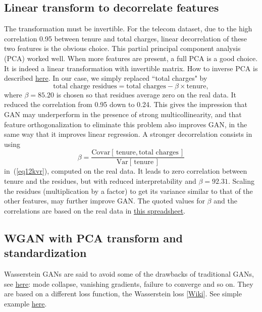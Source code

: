 \documentclass[oneside,10pt]{book}
\begin{document}
\subsection{Linear transform to decorrelate features}\label{lin12qdj}

The transformation must be invertible.  For the telecom dataset, due to the high correlation 0.95 between tenure and total charges, linear decorrelation of these two features is the obvious choice. This partial \textcolor{index}{principal component analysis} (PCA) worked well. When more features are present, a full PCA is a good choice. It is indeed a linear transformation with invertible matrix. How to
 inverse PCA is described \href{https://stats.stackexchange.com/questions/229092/how-to-reverse-pca-and-reconstruct-original-variables-from-several-principal-com}{here}. In our case, we simply replaced ``total charges" by
\begin{equation}
\text{total charge residues} = \text{total charges} - \beta \times \text{tenure}, \label{eq12kvr}
\end{equation}
where $\beta = 85.20$ is chosen so that residues average zero on the real data. It reduced the correlation from 0.95 down to 0.24.  This gives the impression that GAN may underperform in the presence of strong
 multicollinearity, and that feature orthogonalization to eliminate this problem also improves GAN, in the same way that it improves
 linear regression. A stronger decorrelation consists in using 
$$
\beta = \frac{\text{Covar}[\,\text{tenure}, \text{total charges}\,]}{\text{Var}[\,\text{tenure}\,]}
$$ 
 in~(\ref{eq12kvr}), computed on the real data. It leads to zero correlation between tenure and the residues, but with reduced
 interpretability and $\beta=92.31$. Scaling the residues (multiplication by a factor) to get its variance similar to that of the other features, may further improve GAN. The quoted values for $\beta$ and the correlations are based on the real data in 
 \href{https://github.com/VincentGranville/Main/blob/main/telecom.xlsx}{this spreadsheet}.



\subsection{WGAN with PCA transform and standardization}

Wasserstein GANs are said to avoid some of the drawbacks of traditional GANs, see 
\href{https://developers.google.com/machine-learning/gan/problems}{here}: \textcolor{index}{mode collapse}, 
vanishing gradients, failure to converge and so on. They are based on a different loss function, the 
\textcolor{index}{Wasserstein loss} [\href{https://en.wikipedia.org/wiki/Wasserstein_GAN}{Wiki}].
 See simple example \href{https://machinelearningmastery.com/how-to-code-a-wasserstein-generative-adversarial-network-wgan-from-scratch/}{here}.
\end{document}
